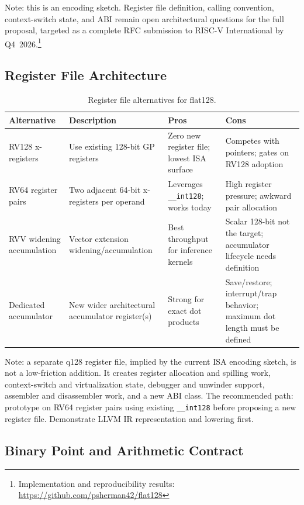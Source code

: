 \documentclass[runningheads]{llncs}
\begin{document}
Note: this is an encoding sketch. Register file definition, calling
convention, context-switch state, and ABI remain open architectural
questions for the full proposal, targeted as a complete RFC submission
to RISC-V International by Q4~2026.\footnote{Implementation and reproducibility results: \url{https://github.com/psherman42/flat128}}

\subsection{Register File Architecture}

\begin{table}[h]
\centering
\caption{Register file alternatives for flat128.}
\label{tab:regfile}
\begin{tabularx}{\textwidth}{lLLL}
\toprule
\textbf{Alternative} & \textbf{Description} & \textbf{Pros} & \textbf{Cons} \\
\midrule
RV128 x-registers & Use existing 128-bit GP registers & Zero new register file; lowest ISA surface & Competes with pointers; gates on RV128 adoption \\
RV64 register pairs & Two adjacent 64-bit x-registers per operand & Leverages \texttt{\_\_int128}; works today & High register pressure; awkward pair allocation \\
RVV widening accumulation & Vector extension widening/accumulation & Best throughput for inference kernels & Scalar 128-bit not the target; accumulator lifecycle needs definition \\
Dedicated accumulator & New wider architectural accumulator register(s) & Strong for exact dot products & Save/restore; interrupt/trap behavior; maximum dot length must be defined \\
\bottomrule
\end{tabularx}
\end{table}

Note: a separate q128 register file, implied by the current ISA
encoding sketch, is not a low-friction addition. It creates register
allocation and spilling work, context-switch and virtualization state,
debugger and unwinder support, assembler and disassembler work, and a
new ABI class. The recommended path: prototype on RV64 register pairs
using existing \texttt{\_\_int128} before proposing a new register file.
Demonstrate LLVM IR representation and lowering first.

\subsection{Binary Point and Arithmetic Contract}
\end{document}
